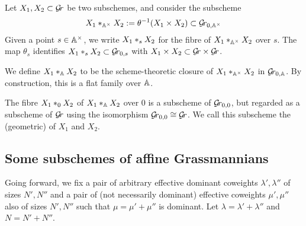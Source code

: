 \documentclass{article}
\begin{document}
Let $ X_1, X_2 \subset \Gr$ be two subschemes, and consider the subscheme 
$$ 
    X_1 \bdfamo X_2 := \theta^{-1}(X_1 \times X_2) \subset \Gr_{0, \AA^\times} 
$$
Given a point $ s \in \Ax$, we write $ X_1 \bdfamf X_2  $ for the fibre of $ X_1 \bdfamo X_2 $ over $s$. The map $ \theta_s$ identifies $ X_1 \bdfamf X_2 \subset \Gr_{0,s}$ with $ X_1 \times X_2 \subset \Gr \times \Gr$.

We define $ X_1 \ast_{\AA} X_2 $ to be the scheme-theoretic closure of $  X_1 \bdfamo X_2 $ in $ \Grbd $. By construction, this is a flat family over $ \AA$.

The fibre $ X_1 \geofu X_2$ of $ X_1 \ast_{\AA} X_2 $ over $0$ is a subscheme of $ \Gr_{0,0} $, but regarded as a subscheme of $ \Gr $ using {the isomorphism} $\Gr_{0,0} \cong \Gr $.  We call this subscheme the (geometric)  of $ X_1 $ and $ X_2$.
% 

\subsection{Some subschemes of affine Grassmannians}
\label{ss:subgrs}

Going forward, we fix a pair of arbitrary effective dominant coweights $\lambda', \lambda'' $ of sizes $N',N''$ and a pair of (not necessarily dominant) effective coweights $\mu',\mu''$ also of sizes $N',N''$ such that $\mu = \mu' + \mu''$ is dominant. 
Let $ \lambda = \lambda' + \lambda'' $ and $ N = N'+N''$.
% 
\end{document}
